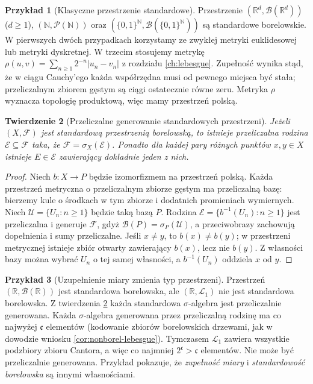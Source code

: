 \documentclass[11pt,a4paper,oneside]{book}
\numberwithin{equation}{chapter}
\theoremstyle{plain}
\newtheorem{twierdzenie}{Twierdzenie}[chapter]
\theoremstyle{definition}
\newtheorem{przyklad}[twierdzenie]{Przykład}
\theoremstyle{remark}
\begin{document}
\begin{przyklad}[Klasyczne przestrzenie standardowe]
Przestrzenie $(\mathbb R^d,\mathcal B(\mathbb R^d))$
($d\ge1$), $(\mathbb N,\mathcal P(\mathbb N))$ oraz
$(\{0,1\}^{\mathbb N},\mathcal B(\{0,1\}^{\mathbb N}))$
są standardowe borelowskie. W pierwszych dwóch przypadkach
korzystamy ze zwykłej metryki euklidesowej lub metryki
dyskretnej. W trzecim stosujemy metrykę
$\rho(u,v)=\sum_{n\ge1}2^{-n}|u_n-v_n|$ z rozdziału
\ref{ch:lebesgue}. Zupełność wynika stąd, że w ciągu
Cauchy'ego każda współrzędna musi od pewnego miejsca
być stała; przeliczalnym zbiorem gęstym są ciągi
ostatecznie równe zeru. Metryka $\rho$ wyznacza topologię
produktową, więc mamy przestrzeń polską.
\end{przyklad}

\begin{twierdzenie}[Przeliczalne generowanie standardowych przestrzeni]
\label{thm:standard-countably-generated}
Jeżeli $(X,\mathcal F)$ jest standardową przestrzenią
borelowską, to istnieje przeliczalna rodzina
$\mathcal E\subseteq\mathcal F$ taka, że
$\mathcal F=\sigma_X(\mathcal E)$. Ponadto dla
każdej pary różnych punktów $x,y\in X$ istnieje
$E\in\mathcal E$ zawierający dokładnie jeden z nich.
\end{twierdzenie}
\begin{proof}
Niech $b:X\to P$ będzie izomorfizmem na przestrzeń polską.
Każda przestrzeń metryczna o przeliczalnym zbiorze gęstym
ma przeliczalną bazę: bierzemy kule o środkach w tym zbiorze
i dodatnich promieniach wymiernych. Niech
$\mathcal U=\{U_n:n\ge1\}$ będzie taką bazą $P$.
Rodzina $\mathcal E=\{b^{-1}(U_n):n\ge1\}$
jest przeliczalna i generuje $\mathcal F$, gdyż
$\mathcal B(P)=\sigma_P(\mathcal U)$, a przeciwobrazy
zachowują dopełnienia i sumy przeliczalne.
Jeśli $x\ne y$, to $b(x)\ne b(y)$; w przestrzeni
metrycznej istnieje zbiór otwarty zawierający $b(x)$,
lecz nie $b(y)$. Z własności bazy można wybrać
$U_n$ o tej samej własności, a $b^{-1}(U_n)$
oddziela $x$ od $y$.
\end{proof}

\begin{przyklad}[Uzupełnienie miary zmienia typ przestrzeni]
\label{ex:completion-not-standard}
Przestrzeń $(\mathbb R,\mathcal B(\mathbb R))$ jest
standardowa borelowska, ale
$(\mathbb R,\mathcal L_1)$ nie jest standardowa borelowska.
Z twierdzenia \ref{thm:standard-countably-generated}
każda standardowa $\sigma$-algebra jest przeliczalnie
generowana. Każda $\sigma$-algebra generowana przez
przeliczalną rodzinę ma co najwyżej $\mathfrak c$
elementów (kodowanie zbiorów borelowskich drzewami,
jak w dowodzie wniosku \ref{cor:nonborel-lebesgue}).
Tymczasem $\mathcal L_1$ zawiera wszystkie podzbiory
zbioru Cantora, a więc co najmniej $2^{\mathfrak c}>
\mathfrak c$ elementów. Nie może być przeliczalnie
generowana. Przykład pokazuje, że \emph{zupełność miary}
i \emph{standardowość borelowska} są innymi własnościami.
\end{przyklad}
\end{document}
